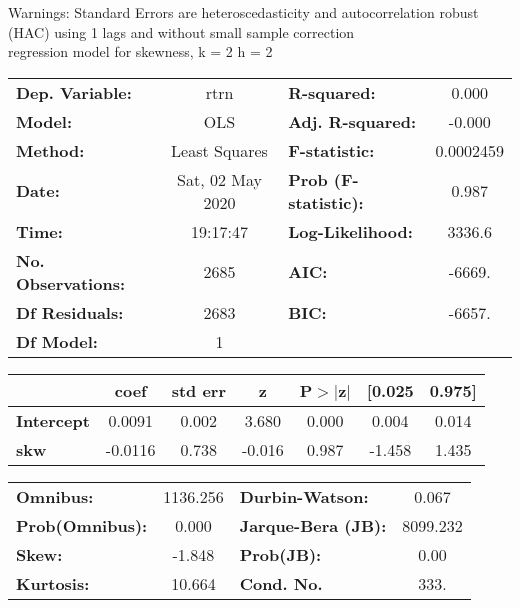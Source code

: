 Warnings: \newline
 [1] Standard Errors are heteroscedasticity and autocorrelation robust (HAC) using 1 lags and without small sample correction\\ 

regression model for skewness, k = 2 h = 2\begin{center}
\begin{tabular}{lclc}
\toprule
\textbf{Dep. Variable:}    &       rtrn       & \textbf{  R-squared:         } &     0.000   \\
\textbf{Model:}            &       OLS        & \textbf{  Adj. R-squared:    } &    -0.000   \\
\textbf{Method:}           &  Least Squares   & \textbf{  F-statistic:       } & 0.0002459   \\
\textbf{Date:}             & Sat, 02 May 2020 & \textbf{  Prob (F-statistic):} &    0.987    \\
\textbf{Time:}             &     19:17:47     & \textbf{  Log-Likelihood:    } &    3336.6   \\
\textbf{No. Observations:} &        2685      & \textbf{  AIC:               } &    -6669.   \\
\textbf{Df Residuals:}     &        2683      & \textbf{  BIC:               } &    -6657.   \\
\textbf{Df Model:}         &           1      & \textbf{                     } &             \\
\bottomrule
\end{tabular}
\begin{tabular}{lcccccc}
                   & \textbf{coef} & \textbf{std err} & \textbf{z} & \textbf{P$> |$z$|$} & \textbf{[0.025} & \textbf{0.975]}  \\
\midrule
\textbf{Intercept} &       0.0091  &        0.002     &     3.680  &         0.000        &        0.004    &        0.014     \\
\textbf{skw}       &      -0.0116  &        0.738     &    -0.016  &         0.987        &       -1.458    &        1.435     \\
\bottomrule
\end{tabular}
\begin{tabular}{lclc}
\textbf{Omnibus:}       & 1136.256 & \textbf{  Durbin-Watson:     } &    0.067  \\
\textbf{Prob(Omnibus):} &   0.000  & \textbf{  Jarque-Bera (JB):  } & 8099.232  \\
\textbf{Skew:}          &  -1.848  & \textbf{  Prob(JB):          } &     0.00  \\
\textbf{Kurtosis:}      &  10.664  & \textbf{  Cond. No.          } &     333.  \\
\bottomrule
\end{tabular}
\end{center}

